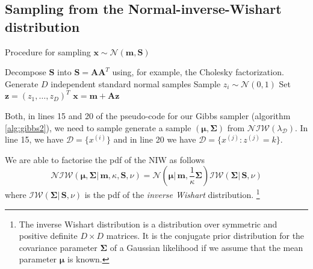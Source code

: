 \documentclass[final,3p,times,twocolumn]{elsarticle}
\let\bs\boldsymbol
\begin{document}
\subsection{Sampling from the Normal-inverse-Wishart distribution}

\begin{algorithm}
\caption{Procedure for sampling $\bs x \sim \mathcal{N}(\bs m,\bs S)$}
\label{alg:gauss}
\begin{algorithmic}[1]
\State Decompose $\bs S$ into $\bs S = \bs A \bs A^T$ using, for example, the Cholesky factorization.
\Statex\State\Comment Generate $D$ independent standard normal samples
\State Sample $z_i \sim \mathcal{N}(0,1)$
\EndFor
\State Set $\bs z = (z_1,\dots,z_D)^T$
\Statex\State\Return $\bs x = \bs m + \bs A \bs z$
\end{algorithmic}
\end{algorithm}

Both, in lines 15 and 20 of the pseudo-code for our Gibbs sampler (algorithm \ref{alg:gibbs2}), we need to sample generate a sample $(\bs\mu,\bs\Sigma)$ from $\mathcal{NIW}(\lambda_\mathcal{D})$.
In line 15, we have $\mathcal{D} = \{x^{(i)}\}$ and in line 20 we have $\mathcal{D} = \{x^{(j)} : z^{(j)} = k\}$.

We are able to factorise the pdf of the NIW as follows 
\begin{equation}
\mathcal{NIW}(\bs\mu,\bs\Sigma|\,\bs m,\kappa,\bs S,\nu) = \mathcal{N}(\bs\mu|\,\bs m,\frac{1}{\kappa}\bs\Sigma)\mathcal{IW}(\bs\Sigma|\,\bs S,\nu)
\end{equation}
where $\mathcal{IW}(\bs\Sigma|\,\bs S,\nu)$ is the pdf of the \emph{inverse Wishart} distribution.
\footnote{The inverse Wishart distribution is a distribution over symmetric and positive definite $D\times D$ matrices. It is the conjugate prior distribution for the covariance parameter $\bs\Sigma$ of a Gaussian likelihood if we assume that the mean parameter $\bs\mu$ is known.}
\end{document}
